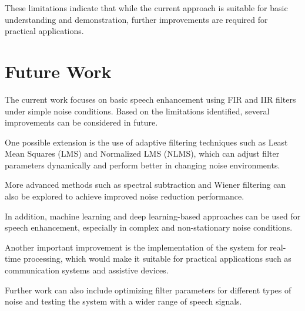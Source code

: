 \documentclass[conference]{IEEEtran}
\begin{document}
These limitations indicate that while the current approach is suitable for basic understanding and demonstration, further improvements are required for practical applications.

\section{Future Work}

The current work focuses on basic speech enhancement using FIR and IIR filters under simple noise conditions. Based on the limitations identified, several improvements can be considered in future.

One possible extension is the use of adaptive filtering techniques such as Least Mean Squares (LMS) and Normalized LMS (NLMS), which can adjust filter parameters dynamically and perform better in changing noise environments.

More advanced methods such as spectral subtraction and Wiener filtering can also be explored to achieve improved noise reduction performance.

In addition, machine learning and deep learning-based approaches can be used for speech enhancement, especially in complex and non-stationary noise conditions.

Another important improvement is the implementation of the system for real-time processing, which would make it suitable for practical applications such as communication systems and assistive devices.

Further work can also include optimizing filter parameters for different types of noise and testing the system with a wider range of speech signals.
\end{document}
